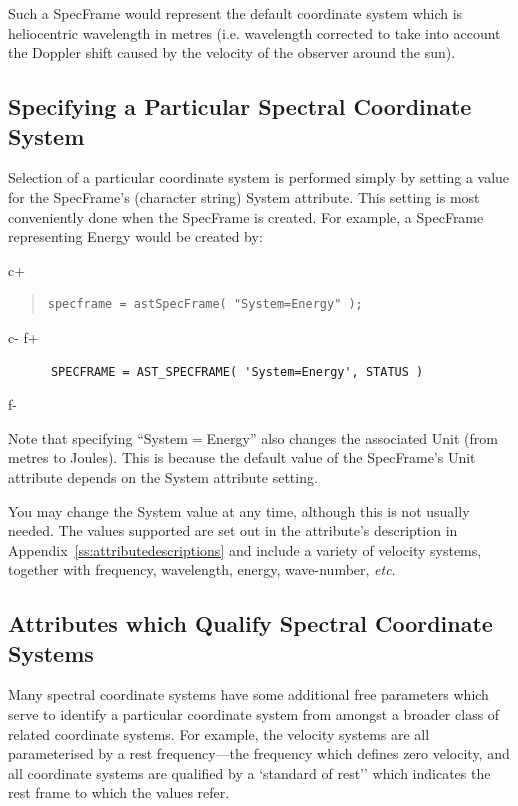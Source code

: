 \documentclass[twoside,11pt]{article}
\newcommand{\appref}[1]{Appendix~\ref{#1}}
\newcommand{\appref}[1]{\ref{#1}}
\begin{document}
Such a SpecFrame would represent the default coordinate system which is 
heliocentric wavelength in metres (i.e. wavelength corrected to take into 
account the Doppler shift caused by the velocity of the observer around the 
sun).

\subsection{Specifying a Particular Spectral Coordinate System}

Selection of a particular coordinate system is performed simply by
setting a value for the SpecFrame's (character string) System
attribute. This setting is most conveniently done when the SpecFrame is
created. For example, a SpecFrame representing Energy would be created by:

c+
\begin{quote}
\small
\begin{verbatim}
specframe = astSpecFrame( "System=Energy" );
\end{verbatim}
\normalsize
\end{quote}
c-
f+
\small
\begin{verbatim}
      SPECFRAME = AST_SPECFRAME( 'System=Energy', STATUS )
\end{verbatim}
\normalsize
f-

Note that specifying ``System$=$Energy'' also changes the associated
Unit (from metres to Joules). This is because the default value
of the SpecFrame's Unit attribute depends on the System attribute setting.

You may change the System value at any time, although this is not
usually needed.  The values supported are set out in the attribute's
description in \appref{ss:attributedescriptions} and include a variety
of velocity systems, together with frequency, wavelength, energy,
wave-number, \emph{etc}.

\subsection{Attributes which Qualify Spectral Coordinate Systems}

Many spectral coordinate systems have some additional free parameters
which serve to identify a particular coordinate system from amongst a
broader class of related coordinate systems. For example, the
velocity systems are all parameterised by a rest frequency---the
frequency which defines zero velocity, and all coordinate systems 
are qualified by a `standard of rest'' which indicates the rest frame to
which the values refer.
\end{document}
